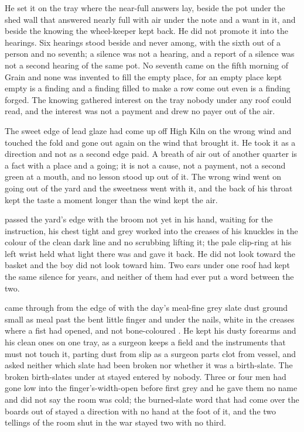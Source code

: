 He set it on the tray where the near-full answers lay, beside the pot under the shed wall that answered nearly full with air under the note and a want in it, and beside the knowing the wheel-keeper kept back. He did not promote it into the hearings. Six hearings stood beside and never among, with the sixth out of a person and no seventh; a silence was not a hearing, and a report of a silence was not a second hearing of the same pot. No seventh came on the fifth morning of Grain and none was invented to fill the empty place, for an empty place kept empty is a finding and a finding filled to make a row come out even is a finding forged. The knowing gathered interest on the tray nobody under any roof could read, and the interest was not a payment and drew no payer out of the air.

The sweet edge of lead glaze had come up off High Kiln on the wrong wind and touched the fold and gone out again on the wind that brought it. He took it as a direction and not as a second edge paid. A breath of air out of another quarter is a fact with a place and a going; it is not a cause, not a payment, not a second green at a mouth, and no lesson stood up out of it. The wrong wind went on going out of the yard and the sweetness went with it, and the back of his throat kept the taste a moment longer than the wind kept the air.

 passed the yard's edge with the broom not yet in his hand, waiting for the instruction, his chest tight and grey  worked into the creases of his knuckles in the colour of the clean dark line and no scrubbing lifting it; the pale clip-ring at his left wrist held what light there was and gave it back. He did not look toward the basket and the boy did not look toward him. Two ears under one roof had kept the same silence for years, and neither of them had ever put a word between the two.

\scenebreak

 came through from the edge of  with the day's meal-fine grey slate dust ground small as meal past the bent little finger and under the nails, white in the creases where a fist had opened, and not bone-coloured . He kept his dusty forearms and his clean ones on one tray, as a surgeon keeps a field and the instruments that must not touch it, parting dust from slip as a surgeon parts clot from vessel, and asked neither which slate had been broken nor whether it was a birth-slate. The broken birth-slates under  at  stayed entered by nobody. Three or four men had gone low into the finger's-width-open  before first grey and he gave them no name and did not say the room was cold; the burned-slate word that had come over the boards out of  stayed a direction with no hand at the foot of it, and the two tellings of the room shut in the war stayed two with no third.

